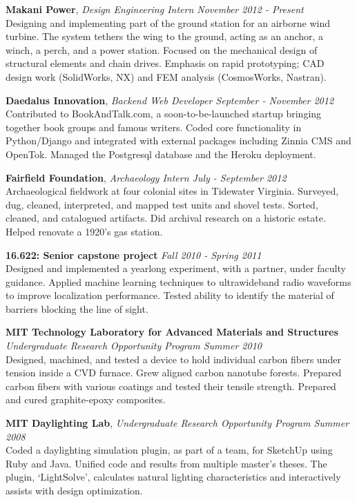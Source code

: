 \documentclass[margin]{res}
\begin{document}
\begin{resume}
 {\bf Makani Power}, \emph{Design Engineering Intern \hfill November 2012 - Present} \\
 Designing and implementing part of the ground station for an airborne wind turbine. The system tethers the wing to the ground, acting as an anchor, a winch, a perch, and a power station. Focused on the mechanical design of structural elements and chain drives. Emphasis on rapid prototyping; CAD design work (SolidWorks, NX) and FEM analysis (CosmosWorks, Nastran).

 {\bf Daedalus Innovation}, \emph{Backend Web Developer \hfill September - November 2012} \\
 Contributed to BookAndTalk.com, a soon-to-be-launched startup bringing together book groups and famous writers. Coded core functionality in Python/Django and integrated with external packages including Zinnia CMS and OpenTok. Managed the Postgresql database and the Heroku deployment.

 {\bf Fairfield Foundation}, 
 \emph{Archaeology Intern \hfill July - September 2012}\\
Archaeological fieldwork at four colonial sites in Tidewater Virginia. Surveyed, dug, cleaned, interpreted, and mapped test units and shovel tests. Sorted, cleaned, and catalogued artifacts. Did archival research on a historic estate. Helped renovate a 1920's gas station.

 {\bf 16.622: Senior capstone project} \hfill \emph{Fall 2010 - Spring 2011} \\
Designed and implemented a yearlong experiment, with a partner, under faculty guidance. Applied machine learning techniques to ultrawideband radio waveforms to improve localization performance. Tested ability to identify the material of barriers blocking the line of sight. 

 {\bf MIT Technology Laboratory for Advanced Materials and Structures } \\
 \emph{Undergraduate Research Opportunity Program \hfill Summer 2010}\\
Designed, machined, and tested a device to hold individual carbon fibers under tension inside a CVD furnace. Grew aligned carbon nanotube forests. Prepared carbon fibers with various coatings and tested their tensile strength. Prepared and cured graphite-epoxy composites.

 {\bf MIT Daylighting Lab}, \emph{Undergraduate Research Opportunity Program \hfill Summer 2008}\\
Coded a daylighting simulation plugin, as part of a team, for SketchUp using Ruby and Java. Unified code and results from multiple master's theses. The plugin, `LightSolve', calculates natural lighting characteristics and interactively assists with design optimization.



\end{resume}
\end{document}
